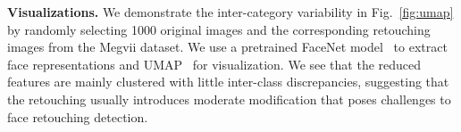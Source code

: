 \documentclass[sigconf]{acmart}
\begin{document}
\noindent\textbf{Visualizations.}
We demonstrate the inter-category variability in Fig.~\ref{fig:umap} by randomly selecting 1000 original images and the corresponding retouching images from the Megvii dataset. 
We use a pretrained FaceNet model~\cite{facenet} to extract face representations and UMAP~\cite{UMAP} for visualization.
We see that the reduced features are mainly clustered with little inter-class discrepancies, suggesting that the retouching usually introduces moderate modification that poses challenges to face retouching detection. 



\end{document}
